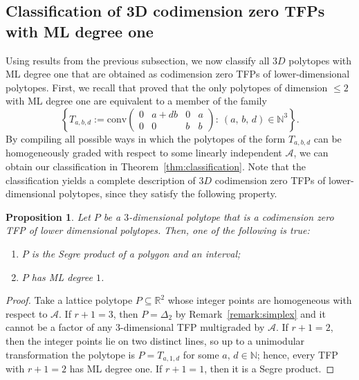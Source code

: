 \documentclass[12pt,reqno]{amsart}   	%
\theoremstyle{plain}
\newtheorem{proposition}[theorem]{Proposition}
\theoremstyle{definition}
\theoremstyle{remark}
\begin{document}
\subsection{Classification of 3D codimension zero TFPs with ML degree one}
Using results from the previous subsection, we now classify all $3D$ polytopes with ML degree one that are obtained as codimension zero TFPs of lower-dimensional polytopes. First, we recall that \cite{vonBothmer2010} proved that the only polytopes of dimension $\leq 2$ with ML degree one are equivalent to a member of the family
\[%
\left\{ T_{a,b,d} := \mathrm{conv}\begin{pmatrix}
    0 & a+db & 0 & a  \\
    0 &  0   & b & b 
\end{pmatrix}:\ (a,\,b,\,d) \in \mathbb{N}^3\right\} .
\]
By compiling all possible ways in which the polytopes of the form $T_{a,b,d}$ can be homogeneously graded with respect to some linearly independent $\mathcal{A}$, we can obtain our classification in Theorem~\ref{thm:classification}. Note that the classification yields a complete description of $3D$ codimension zero TFPs of lower-dimensional polytopes, since they satisfy the following property.

\begin{proposition}\label{prop:3D_TFP}
Let $P$ be a $3$-dimensional polytope that is a codimension zero TFP of lower dimensional polytopes. Then, one of the following is true:
\begin{enumerate}
    \item $P$ is the Segre product of a polygon and an interval;
    \item $P$ has ML degree $1$. 
\end{enumerate}%
\end{proposition}
\begin{proof} Take a lattice polytope $P \subseteq  \mathbb{R}^2$ whose integer points are homogeneous with respect to $\mathcal{A}$. If $r+1=3$, then $P=\Delta_2$ by Remark~\ref{remark:simplex} and it cannot be a factor of any $3$-dimensional TFP multigraded by $\mathcal{A}$. If $r+1=2$, then the integer points lie on two distinct lines, so up to a unimodular transformation the polytope is $P = T_{a,1,d}$ for some $a,\,d \in \mathbb{N}$; hence, every TFP with $r+1=2$ has ML degree one. If $r+1=1$, then it is a Segre product. 
\end{proof}
\end{document}
